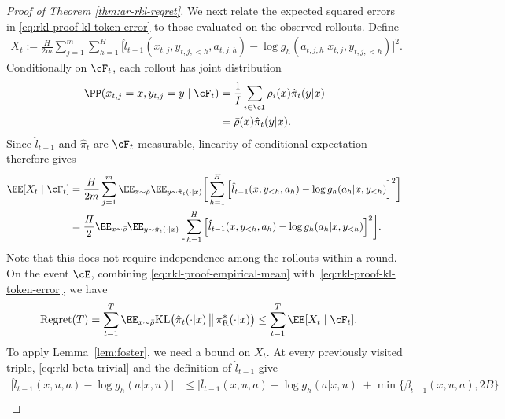 \documentclass[11pt]{article}
\newcommand{\KL}{\text{KL}}
\newcommand{\pir}{\pi_{\mathrm{R}}}
\begin{document}
\begin{proof}[Proof of Theorem \ref{thm:ar-rkl-regret}]
We next relate the expected squared errors in
\eqref{eq:rkl-proof-kl-token-error} to those evaluated on the observed
rollouts. Define
\begin{align*}
    X_t
    :=
    \frac{H}{2m}
    \sum_{j=1}^m\sum_{h=1}^H
    \Big[
        \hat l_{t-1}(x_{t,j},y_{t,j,<h},a_{t,j,h})
        -
        \log g_h(a_{t,j,h}|x_{t,j},y_{t,j,<h})
    \Big]^2.
\end{align*}
Conditionally on $\cF_t$, each rollout has joint distribution
\begin{align*}
    \PP(x_{t,j}=x,y_{t,j}=y\mid\cF_t)
    &=
    \frac1I\sum_{i\in\cI}
    \rho_i(x)\hat\pi_t(y|x)\\
    &=
    \bar\rho(x)\hat\pi_t(y|x).
\end{align*}
Since $\hat l_{t-1}$ and $\hat\pi_t$ are $\cF_t$-measurable,
linearity of conditional expectation therefore gives
\begin{align}
    \EE[X_t\mid\cF_t]
    &=
    \frac{H}{2m}
    \sum_{j=1}^m
    \EE_{x\sim\bar\rho}
    \EE_{y\sim\hat\pi_t(\cdot|x)}
    \bigg[
        \sum_{h=1}^H
        \Big[
            \hat l_{t-1}(x,y_{<h},a_h)
            -
            \log g_h(a_h|x,y_{<h})
        \Big]^2
    \bigg]\notag\\
    &=
    \frac H2
    \EE_{x\sim\bar\rho}
    \EE_{y\sim\hat\pi_t(\cdot|x)}
    \bigg[
        \sum_{h=1}^H
        \Big[
            \hat l_{t-1}(x,y_{<h},a_h)
            -
            \log g_h(a_h|x,y_{<h})
        \Big]^2
    \bigg].
    \label{eq:rkl-proof-empirical-mean}
\end{align}
Note that this does not require independence among the rollouts within a round. On the event $\cE$, combining \eqref{eq:rkl-proof-empirical-mean} with~\eqref{eq:rkl-proof-kl-token-error}, we have
\begin{align}
    \operatorname{Regret}(T)
    &=
    \sum_{t=1}^T
    \EE_{x\sim\bar\rho}
    \KL\bigl(
        \hat\pi_t(\cdot|x)
        \,\big\|\,
        \pir^*(\cdot|x)
    \bigr)
    \leq
    \sum_{t=1}^T\EE[X_t\mid\cF_t].
    \label{eq:rkl-proof-regret-predictable}
\end{align}
To apply Lemma~\ref{lem:foster}, we need a bound on $X_t$. At every previously visited triple,
\eqref{eq:rkl-beta-trivial} and the definition of $\hat l_{t-1}$ give
\begin{align*}
    \big|
        \hat l_{t-1}(x,u,a)-\log g_h(a|x,u)
    \big|
    &\leq
    \big|
        \bar l_{t-1}(x,u,a)-\log g_h(a|x,u)
    \big|
    +
    \min\{\beta_{t-1}(x,u,a),2B\}\\

\end{align*}
\end{proof}
\end{document}
